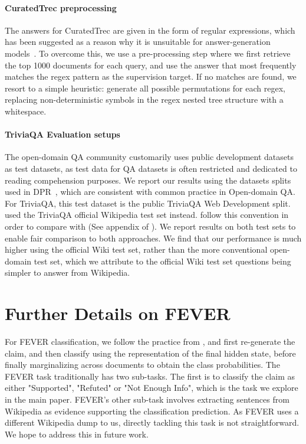 \documentclass{article}
\begin{document}
\paragraph{CuratedTrec preprocessing}
The answers for CuratedTrec are given in the form of regular expressions, which has been suggested as a reason why it is unsuitable for answer-generation models~\cite{guu2020realm}. To overcome this, we use a pre-processing step where we first retrieve the top 1000 documents for each query, and use the answer that most frequently matches the regex pattern as the supervision target. If no matches are found, we resort to a simple heuristic: generate all possible permutations for each regex, replacing non-deterministic symbols in the regex nested tree structure with a whitespace.

\paragraph{TriviaQA Evaluation setups} The open-domain QA community customarily uses public development datasets as test datasets, as test data for QA datasets is often restricted and dedicated to reading compehension purposes. We report our results using the datasets splits used in DPR~\cite{Karpukhin20dense}, which are consistent with common practice in Open-domain QA. For TriviaQA, this test dataset is the public TriviaQA Web Development split.  
\citet{roberts2020t5cqba} used the TriviaQA official Wikipedia test set instead. \citet{fevry2020entities} follow this convention in order to compare with \citet{roberts2020t5cqba} (See appendix of \cite{fevry2020entities}). We report results on both test sets to enable fair comparison to both approaches. We find that our performance is much higher using the official Wiki test set, rather than the more conventional open-domain test set, which we attribute to the official Wiki test set questions being simpler to answer from Wikipedia.

\section{Further Details on FEVER}

For FEVER classification, we follow the practice from \cite{lewis2019bart}, and first re-generate the claim, and then classify using the representation of the final hidden state, before finally marginalizing across documents to obtain the class probabilities. 
The FEVER task traditionally has two sub-tasks. The first is to classify the claim as either "Supported", "Refuted" or "Not Enough Info", which is the task we explore in the main paper. FEVER's other sub-task involves extracting sentences from Wikipedia as evidence supporting the classification prediction. As FEVER uses a different Wikipedia dump to us, directly tackling this task is not straightforward. We hope to address this in future work.
\end{document}
